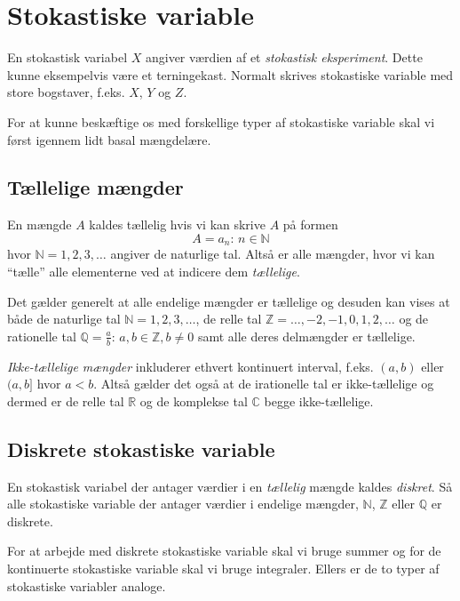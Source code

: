 
\section{Stokastiske variable}
En stokastisk variabel $X$ angiver værdien af et \textit{stokastisk eksperiment}. Dette kunne eksempelvis være et terningekast. Normalt skrives stokastiske variable med store bogstaver, f.eks. $X$, $Y$ og $Z$.

For at kunne beskæftige os med forskellige typer af stokastiske variable skal vi først igennem lidt basal mængdelære.

\subsection{Tællelige mængder}
En mængde $A$ kaldes tællelig hvis vi kan skrive $A$ på formen
\[ 
  A = {a_n: \, n \in \mathbb{N}}
\]
hvor $\mathbb{N} = {1, 2, 3, \ldots}$ angiver de naturlige tal. Altså er alle mængder, hvor vi kan ``tælle'' alle elementerne ved at indicere dem \textit{tællelige}.

Det gælder generelt at alle endelige mængder er tællelige og desuden kan vises at både de naturlige tal $\mathbb{N} = {1, 2, 3, \ldots}$, de relle tal $\mathbb{Z} = {\ldots, -2, -1, 0, 1, 2, \ldots}$ og de rationelle tal $\mathbb{Q} = {\frac{a}{b}: \, a, b \in \mathbb{Z}, b \neq 0}$ samt alle deres delmængder er tællelige.

\textit{Ikke-tællelige mængder} inkluderer ethvert kontinuert interval, f.eks. $(a, b)$ eller $(a, b]$ hvor $a < b$. Altså gælder det også at de irationelle tal er ikke-tællelige og dermed er de relle tal $\mathbb{R}$ og de komplekse tal $\mathbb{C}$ begge ikke-tællelige.


\subsection{Diskrete stokastiske variable}
\begin{definition}
  En stokastisk variabel der antager værdier i en \textit{tællelig} mængde kaldes \textit{diskret}. Så alle stokastiske variable der antager værdier i endelige mængder, $\mathbb{N}$, $\mathbb{Z}$ eller $\mathbb{Q}$ er diskrete. 
\end{definition}

For at arbejde med diskrete stokastiske variable skal vi bruge summer og for de kontinuerte stokastiske variable skal vi bruge integraler. Ellers er de to typer af stokastiske variabler analoge.

